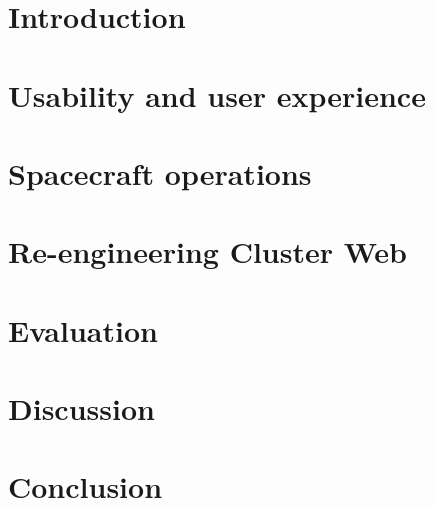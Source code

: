 \documentclass[a4paper, 12pt,titlepage]{dithesis}
\begin{document}
\chapter{Introduction}
\sivunumerot

\chapter{Usability and user experience}\label{usability_chapter}

\chapter{Spacecraft operations}\label{operations_chapter}

\chapter{Re-engineering Cluster Web}\label{cluweb_chapter}

\chapter{Evaluation}\label{evaluation_chapter}

\chapter{Discussion}\label{discussion_chapter}

\chapter{Conclusion}\label{conclusion_chapter}



\end{document}
